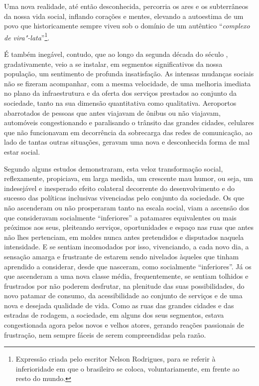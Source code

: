 Uma nova realidade, até então desconhecida, percorria os ares e os
subterrâneos da nossa vida social, inflando corações e mentes, elevando
a autoestima de um povo que historicamente sempre viveu sob o domínio de
um autêntico ``\emph{complexo de vira"-lata}''\footnote{Expressão criada
  pelo escritor Nelson Rodrigues, para se referir à inferioridade em que
  o brasileiro se coloca, voluntariamente, em frente ao resto do mundo.}.

É também inegável, contudo, que ao longo da segunda década do século
, gradativamente, veio a se instalar, em segmentos significativos da
nossa população, um sentimento de profunda insatisfação. As intensas
mudanças sociais não se fizeram acompanhar, com a mesma velocidade, de
uma melhoria imediata no plano da infraestrutura e da oferta dos
serviços prestados ao conjunto da sociedade, tanto na sua dimensão
quantitativa como qualitativa. Aeroportos abarrotados de pessoas que
antes viajavam de ônibus ou não viajavam, automóveis congestionando e
paralisando o trânsito das grandes cidades, celulares que não
funcionavam em decorrência da sobrecarga das redes de comunicação, ao
lado de tantas outras situações, geravam uma nova e desconhecida forma
de mal estar social.

Segundo alguns estudos demonstraram, esta veloz transformação social,
reflexamente, propiciava, em larga medida, um crescente mau humor, ou
seja, um indesejável e inesperado efeito colateral decorrente do
desenvolvimento e do sucesso das políticas inclusivas vivenciadas pelo
conjunto da sociedade. Os que não ascenderam ou não prosperaram tanto na
escala social, viam a ascensão dos que consideravam socialmente
``inferiores'' a patamares equivalentes ou mais próximos aos seus,
pleiteando serviços, oportunidades e espaço nas ruas que antes não lhes
pertenciam, em moldes nunca antes pretendidos e disputados naquela
intensidade. E se sentiam incomodados por isso, vivenciando, a cada novo
dia, a sensação amarga e frustrante de estarem sendo nivelados àqueles
que tinham aprendido a considerar, desde que nasceram, como socialmente
``inferiores''. Já os que ascenderam a uma nova classe média,
frequentemente, se sentiam tolhidos e frustrados por não poderem
desfrutar, na plenitude das suas possibilidades, do novo patamar de
consumo, da acessibilidade ao conjunto de serviços e de uma nova e
desejada qualidade de vida. Como as ruas das grandes cidades e das
estradas de rodagem, a sociedade, em alguns dos seus segmentos, estava
congestionada agora pelos novos e velhos atores, gerando reações
passionais de frustração, nem sempre fáceis de serem compreendidas pela
razão.


